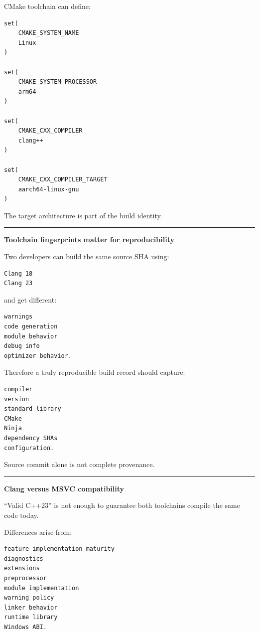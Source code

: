 CMake toolchain can define:

\begin{verbatim}
set(
    CMAKE_SYSTEM_NAME
    Linux
)

set(
    CMAKE_SYSTEM_PROCESSOR
    arm64
)

set(
    CMAKE_CXX_COMPILER
    clang++
)

set(
    CMAKE_CXX_COMPILER_TARGET
    aarch64-linux-gnu
)
\end{verbatim}

The target architecture is part of the build identity.

\begin{center}\rule{0.5\linewidth}{0.5pt}\end{center}

\textbf{Toolchain fingerprints matter for reproducibility}

Two developers can build the same source SHA using:

\begin{verbatim}
Clang 18
Clang 23
\end{verbatim}

and get different:

\begin{verbatim}
warnings
code generation
module behavior
debug info
optimizer behavior.
\end{verbatim}

Therefore a truly reproducible build record should capture:

\begin{verbatim}
compiler
version
standard library
CMake
Ninja
dependency SHAs
configuration.
\end{verbatim}

Source commit alone is not complete provenance.

\begin{center}\rule{0.5\linewidth}{0.5pt}\end{center}

\textbf{Clang versus MSVC compatibility}

``Valid C++23'' is not enough to guarantee both toolchains compile the same code today.

Differences arise from:

\begin{verbatim}
feature implementation maturity
diagnostics
extensions
preprocessor
module implementation
warning policy
linker behavior
runtime library
Windows ABI.
\end{verbatim}

